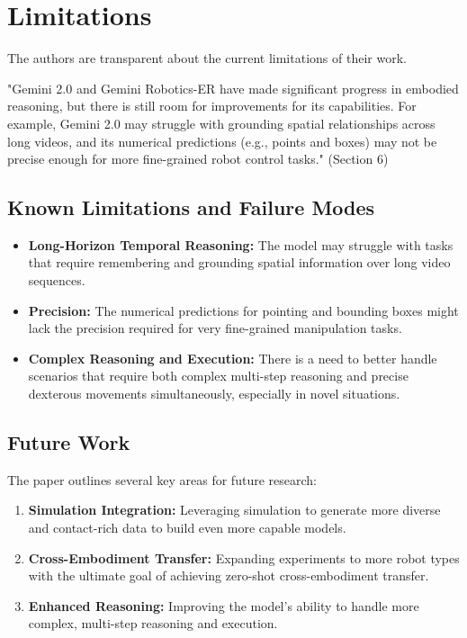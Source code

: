 \documentclass{article}
\begin{document}
\section{Limitations}
The authors are transparent about the current limitations of their work.

\begin{mdframed}[backgroundcolor=gray!10]
"Gemini 2.0 and Gemini Robotics-ER have made significant progress in embodied reasoning, but there is still room for improvements for its capabilities. For example, Gemini 2.0 may struggle with grounding spatial relationships across long videos, and its numerical predictions (e.g., points and boxes) may not be precise enough for more fine-grained robot control tasks." (Section 6)
\end{mdframed}

\subsection{Known Limitations and Failure Modes}
\begin{itemize}
    \item \textbf{Long-Horizon Temporal Reasoning:} The model may struggle with tasks that require remembering and grounding spatial information over long video sequences.
    \item \textbf{Precision:} The numerical predictions for pointing and bounding boxes might lack the precision required for very fine-grained manipulation tasks.
    \item \textbf{Complex Reasoning and Execution:} There is a need to better handle scenarios that require both complex multi-step reasoning and precise dexterous movements simultaneously, especially in novel situations.
\end{itemize}

\subsection{Future Work}
The paper outlines several key areas for future research:
\begin{enumerate}
    \item \textbf{Simulation Integration:} Leveraging simulation to generate more diverse and contact-rich data to build even more capable models.
    \item \textbf{Cross-Embodiment Transfer:} Expanding experiments to more robot types with the ultimate goal of achieving zero-shot cross-embodiment transfer.
    \item \textbf{Enhanced Reasoning:} Improving the model's ability to handle more complex, multi-step reasoning and execution.
\end{enumerate}
\end{document}
